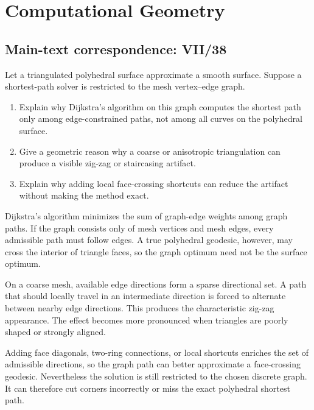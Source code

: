 \section{Computational Geometry}

\subsection*{Main-text correspondence: VII/38}

\begin{problem}
\label{prob:cp-vii-0092}
Let a triangulated polyhedral surface approximate a smooth surface.
Suppose a shortest-path solver is restricted to the mesh vertex--edge graph.

\begin{enumerate}
\item Explain why Dijkstra's algorithm on this graph computes the shortest
path only among edge-constrained paths, not among all curves on the
polyhedral surface.
\item Give a geometric reason why a coarse or anisotropic triangulation can
produce a visible zig-zag or staircasing artifact.
\item Explain why adding local face-crossing shortcuts can reduce the artifact
without making the method exact.
\end{enumerate}
\end{problem}

\begin{solution}
Dijkstra's algorithm minimizes the sum of graph-edge weights among graph
paths.  If the graph consists only of mesh vertices and mesh edges, every
admissible path must follow edges.  A true polyhedral geodesic, however, may
cross the interior of triangle faces, so the graph optimum need not be the
surface optimum.

On a coarse mesh, available edge directions form a sparse directional set.
A path that should locally travel in an intermediate direction is forced to
alternate between nearby edge directions.  This produces the characteristic
zig-zag appearance.  The effect becomes more pronounced when triangles are
poorly shaped or strongly aligned.

Adding face diagonals, two-ring connections, or local shortcuts enriches the
set of admissible directions, so the graph path can better approximate a
face-crossing geodesic.  Nevertheless the solution is still restricted to
the chosen discrete graph.  It can therefore cut corners incorrectly or miss
the exact polyhedral shortest path.
\end{solution}

